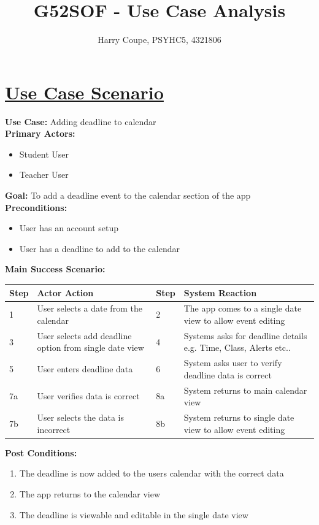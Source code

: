 \documentclass[a4paper]{article}
\begin{document}
\title{G52SOF - Use Case Analysis}
\author{Harry Coupe, PSYHC5, 4321806}
\maketitle
\pagebreak

\section*{\underline{Use Case Scenario}}
\textbf{Use Case:} Adding deadline to calendar\\

\noindent\textbf{Primary Actors:}
\begin{itemize}
	\item Student User
	\item Teacher User
\end{itemize}

\noindent\textbf{Goal:} To add a deadline event to the calendar section of the app\\
\textbf{Preconditions:}
\begin{itemize}
	\item User has an account setup 
	\item User has a deadline to add to the calendar
\end{itemize}
\textbf{Main Success Scenario:}


\noindent\begin{tabular}{|m{0.7cm}|m{7.5cm}|m{0.7cm}|m{7.5cm}|}
	\hline
	\textbf{Step} & \textbf{Actor Action} & \textbf{Step} & \textbf{System Reaction} \\
	\hline
	1 & User selects a date from the calendar & 2 & The app comes to a single date view to allow event editing \\
	\hline
	3 & User selects add deadline option from single date view & 4 & Systems asks for deadline details e.g. Time, Class, Alerts etc..\\
	\hline
	5 & User enters deadline data & 6 & System asks user to verify deadline data is correct \\
	\hline
	7a & User verifies data is correct & 8a & System returns to main calendar view\\
	\hline
	7b & User selects the data is incorrect & 8b & System returns to single date view to allow event editing\\
	\hline
\end{tabular}



\noindent\textbf{Post Conditions:}
\begin{enumerate}
	\item The deadline is now added to the users calendar with the correct data
	\item The app returns to the calendar view
	\item The deadline is viewable and editable in the single date view
\end{enumerate}
\end{document}
